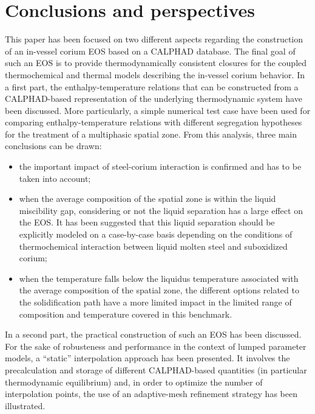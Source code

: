 \documentclass[11pt]{article}\usepackage{geometry} \geometry{letterpaper, margin=25.4mm}
\begin{document}
\section{Conclusions and perspectives} \label{sect:concl}

This paper has been focused on two different aspects regarding the construction of an in-vessel corium EOS based on a CALPHAD database. The final goal of such an EOS is to provide thermodynamically consistent closures for the coupled  thermochemical and thermal models describing the in-vessel corium behavior. 
In a first part, the enthalpy-temperature relations that can be constructed from a CALPHAD-based representation of the underlying thermodynamic system have been discussed. More particularly, a simple numerical test case have been used for comparing enthalpy-temperature relations with different segregation hypotheses for the treatment of a multiphasic spatial zone. From this analysis, three main conclusions can be drawn:
\begin{itemize}
 \item the important impact of steel-corium interaction is confirmed and has to be taken into account;
 \item when the average composition of the spatial zone is within the liquid miscibility gap, considering or not the liquid separation has a large effect on the EOS. It has been suggested that this liquid separation should be explicitly modeled on a case-by-case basis depending on the conditions of thermochemical interaction between liquid molten steel and suboxidized corium;
 \item when the temperature falls below the liquidus temperature associated with the average composition of the spatial zone, the different options related to the solidification path have a more limited impact in the limited range of composition and temperature covered in this benchmark.
\end{itemize}
In a second part, the practical construction of such an EOS has been discussed. For the sake of robusteness and performance in the context of lumped parameter models, a ``static'' interpolation approach has been presented. It involves the precalculation and storage of different CALPHAD-based quantities (in particular thermodynamic equilibrium) and, in order to optimize the number of interpolation points, the use of an adaptive-mesh refinement strategy has been illustrated. 
\end{document}
